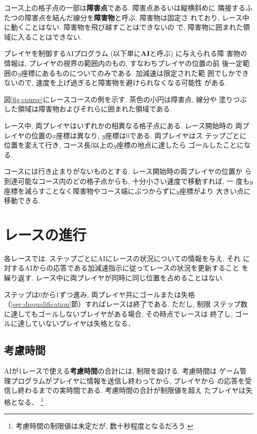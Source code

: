 \documentclass[11pt]{jarticle}
\newcommand\secref[1]{\mbox{\ref{#1}節}}
\begin{document}
コース上の格子点の一部は{\bf 障害点}である.  障害点あるいは縦横斜めに
隣接するふたつの障害点を結んだ線分を{\bf 障害物}と呼ぶ. 障害物は固定さ
れており, レース中に動くことはない.  障害物を飛び越すことはできないの
で, 障害物に囲まれた領域に入ることはできない.

プレイヤを制御するAIプログラム (以下単に{\bf AI}と呼ぶ) に与えられる障
害物の情報は, プレイヤの視界の範囲内のもの, すなわちプレイヤの位置の前
後一定範囲の$y$座標にあるものについてのみである. 加減速は限定された範
囲でしかできないので, 速度を上げ過ぎると障害物を避けられなくなる可能性
がある.

図\ref{fig:course}にレースコースの例を示す. 茶色の小円は障害点, 線分や
塗りつぶした領域は障害物およびそれらに囲まれた領域である.

レース中, 両プレイヤはいずれかの相異なる格子点にある.  レース開始時の
両プレイヤの位置の$x$座標は異なり, $y$座標は$0$である.  両プレイヤはス
テップごとに位置を変えて行き, コース長$l$以上の$y$座標の地点に達したら
ゴールしたことになる.

コースには行き止まりがないものとする. レース開始時の両プレイヤの位置か
ら到達可能なコース内のどの格子点からも, 十分小さい速度で移動すれば, 一
度も$y$座標を減らすことなく障害物やコース端にぶつからずに$y$座標がより
大きい点に移動できる.

\section{レースの進行}\label{sec:race_process}
各レースでは, ステップごとにAIにレースの状況についての情報を与え, それ
に対するAIからの応答である加減速指示に従ってレースの状況を更新すること
を繰り返す.  レース中に両プレイヤが同時に同じ位置を占めることはない.

ステップは0から1ずつ進み, 両プレイヤ共にゴールまたは失格
（\secref{sec:disqualification}）すればレースは終了である. ただし, 制限
ステップ数に達してもゴールしないプレイヤがある場合, その時点でレースは
終了し, ゴールに達していないプレイヤは失格となる．

\subsection{考慮時間}\label{sec:consideration_time}
AIが1レースで使える{\bf 考慮時間}の合計には, 制限を設ける. 考慮時間は
ゲーム管理プログラムがプレイヤに情報を送信し終わってから, プレイヤから
の応答を受信し終わるまでの実時間である.  考慮時間の合計が制限値を超え
たプレイヤは失格となる．
\footnote{考慮時間の制限値は未定だが, 数十秒程度となるだろう.}
\end{document}
